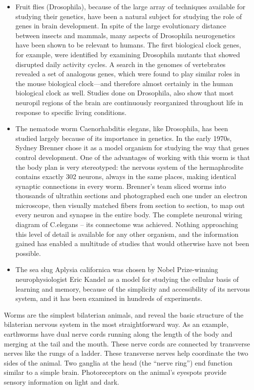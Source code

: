\documentclass[]{book}
\providecommand{\tightlist}{%
  \setlength{\itemsep}{0pt}\setlength{\parskip}{0pt}}
\begin{document}
\begin{itemize}
\tightlist
\item
  Fruit flies (Drosophila), because of the large array of techniques available for studying their genetics, have been a natural subject for studying the role of genes in brain development. In spite of the large evolutionary distance between insects and mammals, many aspects of Drosophila neurogenetics have been shown to be relevant to humans. The first biological clock genes, for example, were identified by examining Drosophila mutants that showed disrupted daily activity cycles. A search in the genomes of vertebrates revealed a set of analogous genes, which were found to play similar roles in the mouse biological clock---and therefore almost certainly in the human biological clock as well. Studies done on Drosophila, also show that most neuropil regions of the brain are continuously reorganized throughout life in response to specific living conditions.
\item
  The nematode worm Caenorhabditis elegans, like Drosophila, has been studied largely because of its importance in genetics. In the early 1970s, Sydney Brenner chose it as a model organism for studying the way that genes control development. One of the advantages of working with this worm is that the body plan is very stereotyped: the nervous system of the hermaphrodite contains exactly 302 neurons, always in the same places, making identical synaptic connections in every worm. Brenner's team sliced worms into thousands of ultrathin sections and photographed each one under an electron microscope, then visually matched fibers from section to section, to map out every neuron and synapse in the entire body. The complete neuronal wiring diagram of C.elegans -- its connectome was achieved. Nothing approaching this level of detail is available for any other organism, and the information gained has enabled a multitude of studies that would otherwise have not been possible.
\item
  The sea slug Aplysia californica was chosen by Nobel Prize-winning neurophysiologist Eric Kandel as a model for studying the cellular basis of learning and memory, because of the simplicity and accessibility of its nervous system, and it has been examined in hundreds of experiments.
\end{itemize}

Worms are the simplest bilaterian animals, and reveal the basic structure of the bilaterian nervous system in the most straightforward way. As an example, earthworms have dual nerve cords running along the length of the body and merging at the tail and the mouth. These nerve cords are connected by transverse nerves like the rungs of a ladder. These transverse nerves help coordinate the two sides of the animal. Two ganglia at the head (the ``nerve ring'') end function similar to a simple brain. Photoreceptors on the animal's eyespots provide sensory information on light and dark.
\end{document}

